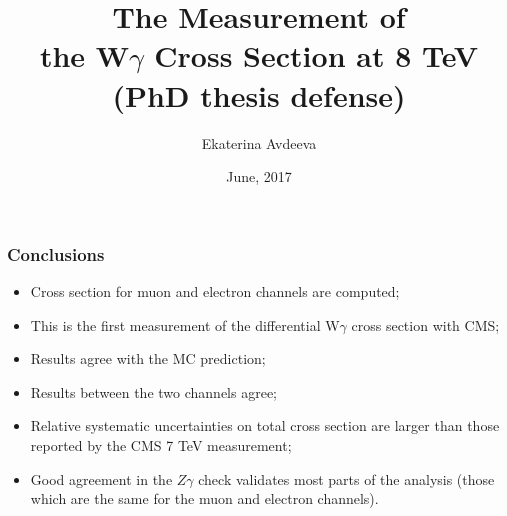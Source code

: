 \documentclass{beamer}
\title{The Measurement of \\ the W$\gamma$ Cross Section at 8 TeV \\ (PhD thesis defense) }
\author{Ekaterina Avdeeva}
\institute{University of Nebraska - Lincoln}
\date{June, 2017}
\begin{document}
\begin{frame}
\titlepage
\end{frame}














\begin{frame}\frametitle{Conclusions}
  \scriptsize
  \begin{itemize}
     \item Cross section for muon and electron channels are computed; 
     \item This is the first measurement of the differential W$\gamma$ cross section with CMS;
     \item Results agree with the MC prediction;
     \item Results between the two channels agree;
     \item Relative systematic uncertainties on total cross section are larger than those reported by the CMS 7 TeV measurement;
     \item Good agreement in the $Z\gamma$ check validates most parts of the analysis (those which are the same for the muon and electron channels).
  \end{itemize}
\end{frame}%

%
\end{document}

